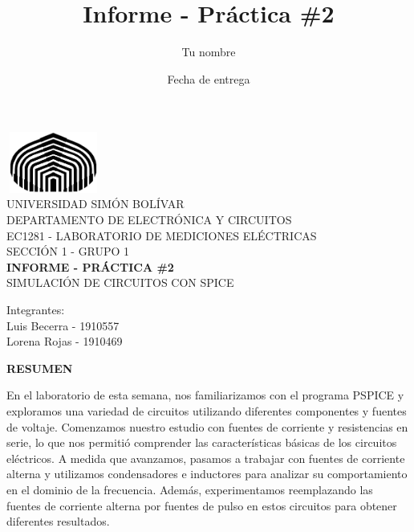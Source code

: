 \documentclass[12pt]{article}
\title{Informe - Práctica \#2}
\author{Tu nombre}
\date{Fecha de entrega}
\begin{document}
	
	\thispagestyle{empty}
	
	\begin{center}
		\includegraphics[width=3.1cm,height=2cm]{logo}\\
		UNIVERSIDAD SIMÓN BOLÍVAR\\
		DEPARTAMENTO DE ELECTRÓNICA Y CIRCUITOS\\
		EC1281 - LABORATORIO DE MEDICIONES ELÉCTRICAS\\
		SECCIÓN 1 - GRUPO 1\\
		
		\vspace{7cm}
		\textbf{\Large INFORME - PRÁCTICA \#2}\\
		SIMULACIÓN DE CIRCUITOS CON SPICE\\
	\end{center}
	
	\begin{flushleft}
		\vspace{9cm}
		\hfill Integrantes:\\
		\hfill {\large Luis Becerra - 1910557}\\
		\hfill {\large Lorena Rojas - 1910469}\\
	\end{flushleft}
	
	\newpage
	
	
	\begin{center}
		\textbf{\large RESUMEN}\\
	\end{center}
	
	En el laboratorio de esta semana, nos familiarizamos con el programa PSPICE y exploramos una variedad de circuitos utilizando diferentes componentes y fuentes de voltaje. Comenzamos nuestro estudio con fuentes de corriente y resistencias en serie, lo que nos permitió comprender las características básicas de los circuitos eléctricos. A medida que avanzamos, pasamos a trabajar con fuentes de corriente alterna y utilizamos condensadores e inductores para analizar su comportamiento en el dominio de la frecuencia. Además, experimentamos reemplazando las fuentes de corriente alterna por fuentes de pulso en estos circuitos para obtener diferentes resultados.\\
	
\end{document}
